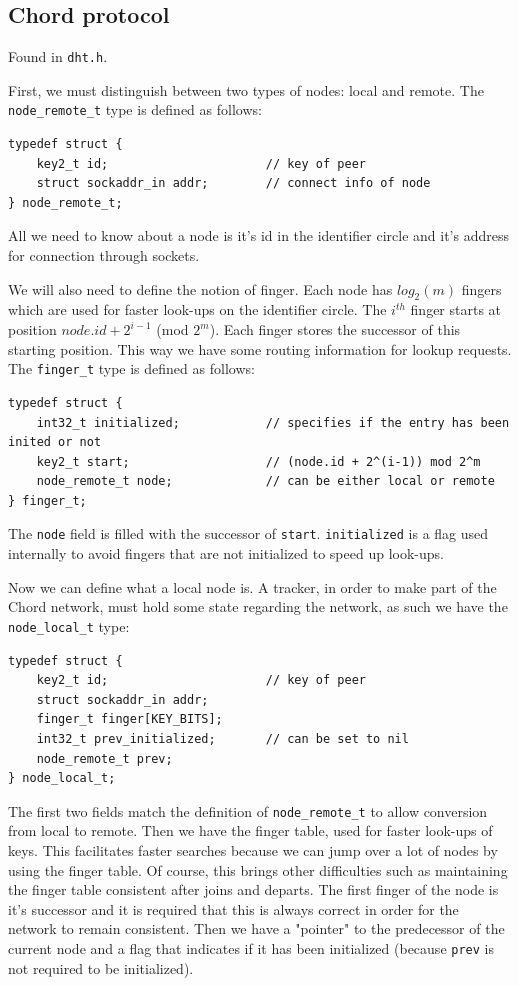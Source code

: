 \documentclass[runningheads]{llncs}
\begin{document}
\subsection{Chord protocol}
Found in \verb|dht.h|.

First, we must distinguish between two types of nodes: local and remote. The \verb|node_remote_t| type is defined as follows:
\begin{lstlisting}
typedef struct {
    key2_t id;                      // key of peer
    struct sockaddr_in addr;        // connect info of node
} node_remote_t;
\end{lstlisting}
All we need to know about a node is it's id in the identifier circle and it's address for connection through sockets.

We will also need to define the notion of finger. Each node has $log_2(m)$ fingers which are used for faster look-ups on the identifier circle. The $i^{th}$ finger starts at position $node.id + 2^{i-1}$ (mod $2^m$). Each finger stores the successor of this starting position. This way we have some routing information for lookup requests. The \verb|finger_t| type is defined as follows:
\begin{lstlisting}
typedef struct {
    int32_t initialized;            // specifies if the entry has been inited or not
    key2_t start;                   // (node.id + 2^(i-1)) mod 2^m
    node_remote_t node;             // can be either local or remote
} finger_t;
\end{lstlisting}
The \verb|node| field is filled with the successor of \verb|start|. \verb|initialized| is a flag used internally to avoid fingers that are not initialized to speed up look-ups.

Now we can define what a local node is. A tracker, in order to make part of the Chord network, must hold some state regarding the network, as such we have the \verb|node_local_t| type:
\begin{lstlisting}
typedef struct {
    key2_t id;                      // key of peer
    struct sockaddr_in addr;
    finger_t finger[KEY_BITS];
    int32_t prev_initialized;       // can be set to nil
    node_remote_t prev;
} node_local_t;    
\end{lstlisting}
The first two fields match the definition of \verb|node_remote_t| to allow conversion from local to remote. Then we have the finger table, used for faster look-ups of keys. This facilitates faster searches because we can jump over a lot of nodes by using the finger table. Of course, this brings other difficulties such as maintaining the finger table consistent after joins and departs. The first finger of the node is it's successor and it is required that this is always correct in order for the network to remain consistent. Then we have a "pointer" to the predecessor of the current node and a flag that indicates if it has been initialized (because \verb|prev| is not required to be initialized).
\end{document}
